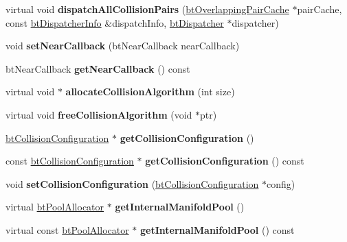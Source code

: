 \begin{DoxyCompactItemize}
virtual void {\bfseries dispatch\+All\+Collision\+Pairs} (\hyperlink{classbtOverlappingPairCache}{bt\+Overlapping\+Pair\+Cache} $\ast$pair\+Cache, const \hyperlink{structbtDispatcherInfo}{bt\+Dispatcher\+Info} \&dispatch\+Info, \hyperlink{classbtDispatcher}{bt\+Dispatcher} $\ast$dispatcher)
\item 
\mbox{\label{classbtCollisionDispatcher_a53ec6fa98dde94222f4916bd980981e0}} 
void {\bfseries set\+Near\+Callback} (bt\+Near\+Callback near\+Callback)
\item 
\mbox{\label{classbtCollisionDispatcher_a52a6fac42055890af3ae600f502dfddd}} 
bt\+Near\+Callback {\bfseries get\+Near\+Callback} () const
\item 
\mbox{\label{classbtCollisionDispatcher_a27278c1bb32830dbecc3be5e9e060952}} 
virtual void $\ast$ {\bfseries allocate\+Collision\+Algorithm} (int size)
\item 
\mbox{\label{classbtCollisionDispatcher_a5f02af5ed65144aec145dba6dbbb17a7}} 
virtual void {\bfseries free\+Collision\+Algorithm} (void $\ast$ptr)
\item 
\mbox{\label{classbtCollisionDispatcher_ac48d53e4cfee3a5d2335c82693f7bc1f}} 
\hyperlink{classbtCollisionConfiguration}{bt\+Collision\+Configuration} $\ast$ {\bfseries get\+Collision\+Configuration} ()
\item 
\mbox{\label{classbtCollisionDispatcher_a881702f995fd834a2e43a675c4c49117}} 
const \hyperlink{classbtCollisionConfiguration}{bt\+Collision\+Configuration} $\ast$ {\bfseries get\+Collision\+Configuration} () const
\item 
\mbox{\label{classbtCollisionDispatcher_a3bc97f728f28889f65b62613f293ff99}} 
void {\bfseries set\+Collision\+Configuration} (\hyperlink{classbtCollisionConfiguration}{bt\+Collision\+Configuration} $\ast$config)
\item 
\mbox{\label{classbtCollisionDispatcher_ad83aab17348866b388615d602ea8be55}} 
virtual \hyperlink{classbtPoolAllocator}{bt\+Pool\+Allocator} $\ast$ {\bfseries get\+Internal\+Manifold\+Pool} ()
\item 
\mbox{\label{classbtCollisionDispatcher_aab59b2bf7724d367109ce0b94310bcf7}} 
virtual const \hyperlink{classbtPoolAllocator}{bt\+Pool\+Allocator} $\ast$ {\bfseries get\+Internal\+Manifold\+Pool} () const
\end{DoxyCompactItemize}
